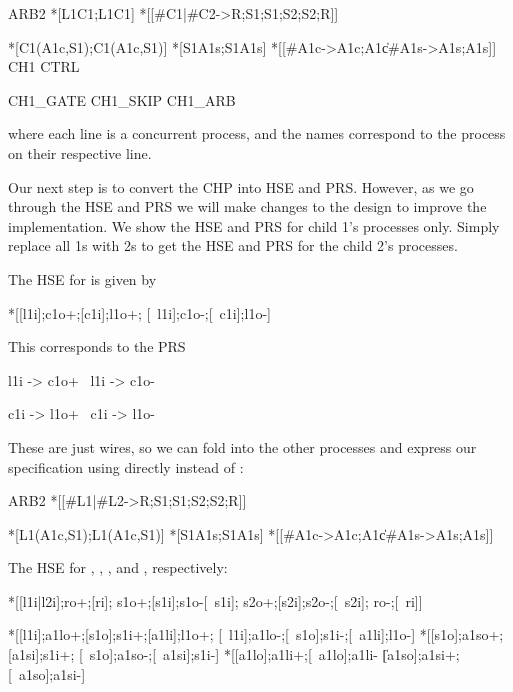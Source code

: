 \documentclass[aer.tex]{subfiles}
\begin{document}
\begin{csp}
ARB2\equiv
  *[L1\star\!C1;L1\star\!C1]
  *[[#{C1}|#{C2}->R;S1;S1;S2;S2;R]]

  *[C1\star(A1c,S1);C1\star(A1c,S1)]
  *[S1\star\!A1s;S1\star\!A1s]
  *[[#{A1c}->A1c;A1c\|#{A1s}->A1s;A1s]]
\equiv
  CH1
  CTRL 
 
  CH1_GATE
  CH1_SKIP
  CH1_ARB
\end{csp}

\noindent where each line is a concurrent process,
and the names correspond to the process on their respective line. 

Our next step is to convert the CHP into HSE and PRS.
However, as we go through the HSE and PRS we will make changes
to the design to improve the implementation.
We show the HSE and PRS for child 1's processes only. 
Simply replace all 1s with 2s to get the HSE and PRS for the child 2's processes.

\noindent The HSE for  is given by

\begin{hse}
  *[[l1i];c1o+;[c1i];l1o+;
    [~l1i];c1o-;[~c1i];l1o-]
\end{hse}

\noindent This corresponds to the PRS 

\begin{prs2}
l1i -> c1o+
~l1i -> c1o-

c1i -> l1o+
~c1i -> l1o-
\end{prs2}

\noindent These are just wires, so we can fold  into the other processes
and express our specification using  directly instead of :

\begin{csp}
ARB2\equiv
  *[[#{L1}|#{L2}->R;S1;S1;S2;S2;R]]

  *[L1\star(A1c,S1);L1\star(A1c,S1)]
  *[S1\star\!A1s;S1\star\!A1s]
  *[[#{A1c}->A1c;A1c\|#{A1s}->A1s;A1s]]
\end{csp}

\noindent The HSE for , , , and , respectively:

\begin{hse}
  *[[l1i|l2i];ro+;[ri];
    s1o+;[s1i];s1o-[~s1i];
    s2o+;[s2i];s2o-;[~s2i];
    ro-;[~ri]]
    
  *[[l1i];a1lo+;[s1o];s1i+;[a1li];l1o+;
    [~l1i];a1lo-;[~s1o];s1i-;[~a1li];l1o-]
  *[[s1o];a1so+;[a1si];s1i+;
    [~s1o];a1so-;[~a1si];s1i-]
  *[[a1lo];a1li+;[~a1lo];a1li-
   \|[a1so];a1si+;[~a1so];a1si-]
\end{hse}
\end{document}
